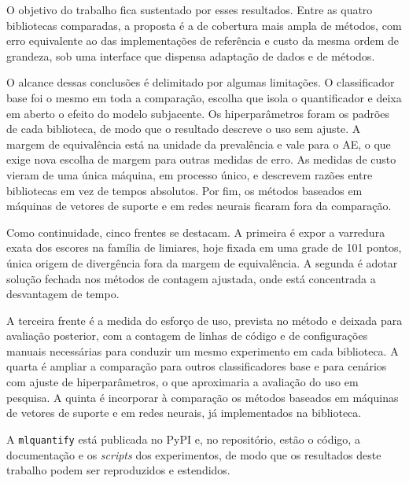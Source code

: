 O objetivo do trabalho fica sustentado por esses resultados. Entre as quatro bibliotecas
comparadas, a proposta é a de cobertura mais ampla de métodos, com erro equivalente ao
das implementações de referência e custo da mesma ordem de grandeza, sob uma interface
que dispensa adaptação de dados e de métodos.

O alcance dessas conclusões é delimitado por algumas limitações. O classificador base foi
o mesmo em toda a comparação, escolha que isola o quantificador e deixa em aberto o
efeito do modelo subjacente. Os hiperparâmetros foram os padrões de cada biblioteca, de
modo que o resultado descreve o uso sem ajuste. A margem de equivalência está na unidade
da prevalência e vale para o AE, o que exige nova escolha de margem para outras medidas
de erro. As medidas de custo vieram de uma única máquina, em processo único, e descrevem
razões entre bibliotecas em vez de tempos absolutos. Por fim, os métodos baseados em
máquinas de vetores de suporte e em redes neurais ficaram fora da comparação.

Como continuidade, cinco frentes se destacam. A primeira é expor a varredura exata dos
escores na família de limiares, hoje fixada em uma grade de 101 pontos, única origem de
divergência fora da margem de equivalência. A segunda é adotar solução fechada nos
métodos de contagem ajustada, onde está concentrada a desvantagem de tempo.

A terceira frente é a medida do esforço de uso, prevista no método e deixada para
avaliação posterior, com a contagem de linhas de código e de configurações manuais
necessárias para conduzir um mesmo experimento em cada biblioteca. A quarta é ampliar a
comparação para outros classificadores base e para cenários com ajuste de
hiperparâmetros, o que aproximaria a avaliação do uso em pesquisa. A quinta é incorporar
à comparação os métodos baseados em máquinas de vetores de suporte e em redes neurais,
já implementados na biblioteca.

A \texttt{mlquantify} está publicada no PyPI e, no repositório, estão o código, a
documentação e os \textit{scripts} dos experimentos, de modo que os resultados deste
trabalho podem ser reproduzidos e estendidos.
